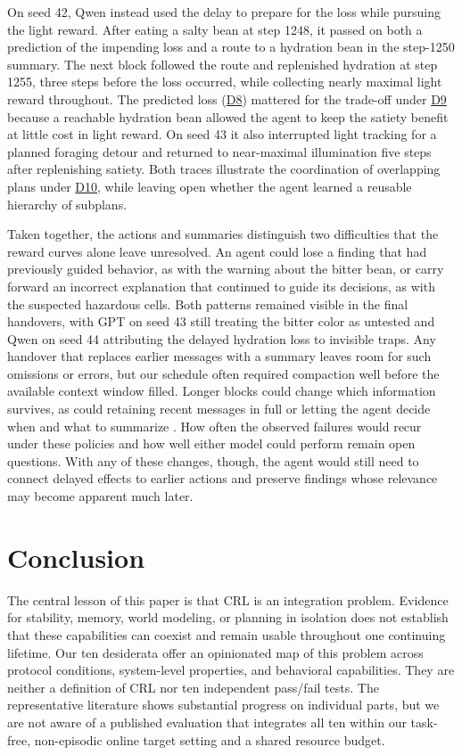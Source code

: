 \documentclass[10pt,journal,compsoc]{IEEEtran}
\newif\ifincludepilotprompts
\DeclareRobustCommand{\Dref}[1]{\hyperref[sec:d#1]{D#1}}
\begin{document}
On seed 42, Qwen instead used the delay to prepare for the loss while pursuing the light reward.
After eating a salty bean at step 1248, it passed on both a prediction of the impending loss and a route to a hydration bean in the step-1250 summary.
The next block followed the route and replenished hydration at step 1255, three steps before the loss occurred, while collecting nearly maximal light reward throughout.
The predicted loss (\Dref{8}) mattered for the trade-off under \Dref{9} because a reachable hydration bean allowed the agent to keep the satiety benefit at little cost in light reward.
On seed 43 it also interrupted light tracking for a planned foraging detour and returned to near-maximal illumination five steps after replenishing satiety.
Both traces illustrate the coordination of overlapping plans under \Dref{10}, while leaving open whether the agent learned a reusable hierarchy of subplans.

Taken together, the actions and summaries distinguish two difficulties that the reward curves alone leave unresolved.
An agent could lose a finding that had previously guided behavior, as with the warning about the bitter bean, or carry forward an incorrect explanation that continued to guide its decisions, as with the suspected hazardous cells.
Both patterns remained visible in the final handovers, with GPT on seed 43 still treating the bitter color as untested and Qwen on seed 44 attributing the delayed hydration loss to invisible traps\ifincludepilotprompts\ (Appendix~\ref{app:companion-final-handovers})\fi.
Any handover that replaces earlier messages with a summary leaves room for such omissions or errors, but our schedule often required compaction well before the available context window filled.
Longer blocks could change which information survives, as could retaining recent messages in full or letting the agent decide when and what to summarize \cite{devoto2026}.
How often the observed failures would recur under these policies and how well either model could perform remain open questions.
With any of these changes, though, the agent would still need to connect delayed effects to earlier actions and preserve findings whose relevance may become apparent much later.

\section{Conclusion}

The central lesson of this paper is that CRL is an integration problem.
Evidence for stability, memory, world modeling, or planning in isolation does not establish that these capabilities can coexist and remain usable throughout one continuing lifetime.
Our ten desiderata offer an opinionated map of this problem across protocol conditions, system-level properties, and behavioral capabilities.
They are neither a definition of CRL nor ten independent pass/fail tests.
The representative literature shows substantial progress on individual parts, but we are not aware of a published evaluation that integrates all ten within our task-free, non-episodic online target setting and a shared resource budget.
\end{document}
